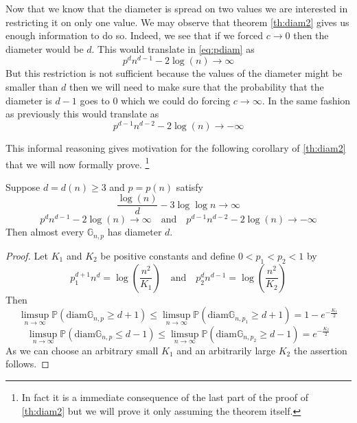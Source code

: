 Now that we know that the diameter is spread on two values we are interested in restricting it on only one value. 
We may observe that theorem \ref{th:diam2} gives us enough information to do so.
Indeed, we see that if we forced $c \to 0$ then the diameter would be $d$. This would translate in \ref{eq:pdiam} as
\begin{equation}
	p^dn^{d-1} - 2\log(n) \longrightarrow \infty
\end{equation}
But this restriction is not sufficient because the values of the diameter might be smaller than $d$ then we will need to make sure that the probability that the diameter is $d-1$ goes to 0 which we could do forcing $c \to \infty$.
In the same fashion as previously this would translate as
\begin{equation}
	p^{d-1}n^{d-2} - 2 \log(n) \longrightarrow -\infty
\end{equation}

This informal reasoning gives motivation for the following corollary of \ref{th:diam2} that we will now formally prove. 
\footnote{In fact it is a immediate consequence of the last part of the proof of \ref{th:diam2} but we will prove it only assuming the theorem itself.}
\begin{corollary}\label{th:aediam}
	Suppose $d = d(n) \geq 3$ and $p = p(n)$ satisfy
	\begin{equation}
		\frac{\log(n)}{d} - 3\log\log n \to \infty
	\end{equation}
	\begin{equation}
		p^dn^{d-1} - 2\log(n) \longrightarrow \infty \quad \text{and} \quad
		p^{d-1}n^{d-2} - 2 \log(n) \longrightarrow -\infty
	\end{equation}
	Then almost every $\mathbb{G}_{n,p}$ has diameter $d$.
\end{corollary}
\begin{proof}
	Let $K_1$ and $K_2$ be positive constants and define $0<p_1<p_2<1$ by
	\begin{equation}
		p_1^{d+1}n^d = \log(\frac{n^2}{K_1}) \quad \text{and} \quad p_2^{d}n^{d-1} = \log(\frac{n^2}{K_2})	
	\end{equation}
	Then 
	\begin{equation}
		\limsup_{n \to \infty} \mathbb{P}(\text{diam}\mathbb{G}_{n,p} \geq d+1 )
		\leq  \limsup_{n \to \infty} \mathbb{P}(\text{diam}\mathbb{G}_{n,p_1} \geq d+1 ) = 1 - e^{-\frac{K_1}{2}}
	\end{equation}
	\begin{equation}
		\limsup_{n \to \infty} \mathbb{P}(\text{diam}\mathbb{G}_{n,p} \leq d-1 )
		\leq  \limsup_{n \to \infty} \mathbb{P}(\text{diam}\mathbb{G}_{n,p_2} \geq d-1 ) = e^{-\frac{K_2}{2}}
	\end{equation}
	As we can choose an arbitrary small $K_1$ and an arbitrarily large $K_2$ the assertion follows.
\end{proof}


